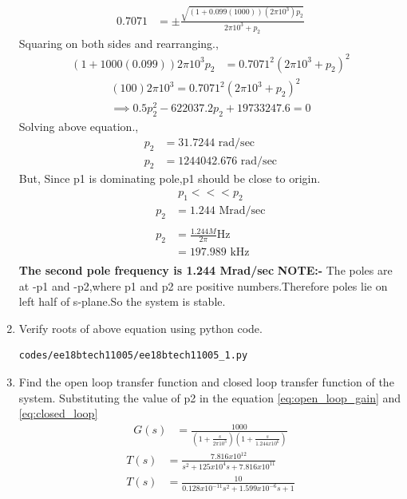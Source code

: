 \begin{enumerate}[label=\thesubsection.\arabic*.,ref=\thesubsection.\theenumi]
\begin{align}
    0.7071 &= \pm{\frac{\sqrt{(1+0.099(1000))(2\pi10^3)p_2}}{2\pi10^3+p_2}}
\end{align}
Squaring on both sides and rearranging.,
\begin{align}
    (1+1000(0.099))2\pi10^3p_2 &= 0.7071^2{(2\pi10^3+p_2)}^2
\end{align}
\begin{align}
    (100)2\pi10^3 = 0.7071^2(2\pi10^3+p_2)^2\\
    \implies 0.5p_2^2-622037.2p_2+19733247.6=0
\end{align}
Solving above equation.,
\begin{align}
p_2 &= 31.7244 \text{ rad/sec}\\
p_2 &= 1244042.676 \text{ rad/sec}
\end{align}
But, Since p1 is dominating pole,p1 should be close to origin.
\begin{align}
    p_1 <<< p_2
\end{align}
\begin{align}
p_2 &= 1.244\text{ Mrad/sec}\\
\\
p_2 &= \frac{1.244M}{2\pi} \text{Hz}\\
&= 197.989\text{ kHz}\\
\end{align}
\textbf{The second pole frequency is 1.244 Mrad/sec}
\textbf{NOTE:-} The poles are at -p1 and -p2,where p1 and p2 are positive numbers.Therefore poles lie on left half of s-plane.So the system is stable.
\item Verify roots of above equation using python code.
\begin{lstlisting}
codes/ee18btech11005/ee18btech11005_1.py
\end{lstlisting}
\item Find the open loop transfer function and closed loop transfer function of the system.
\solution Substituting the value of p2 in  the equation \ref{eq:open_loop_gain} and \ref{eq:closed_loop}
\begin{align}
     G(s) &= \frac{1000}{(1+\frac{s}{2\pi10^3})(1+\frac{s}{1.244x10^6})}
\end{align}
\begin{align}
    T(s) &= \frac{7.816x10^{12}}{s^2+125x10^4s+7.816x10^{11}} \\
    T(s) &= \frac{10}{0.128x10^{-11}s^2+1.599x10^{-6}s+1}
    \label{eq:Transfer_func}
\end{align}

\end{enumerate}
